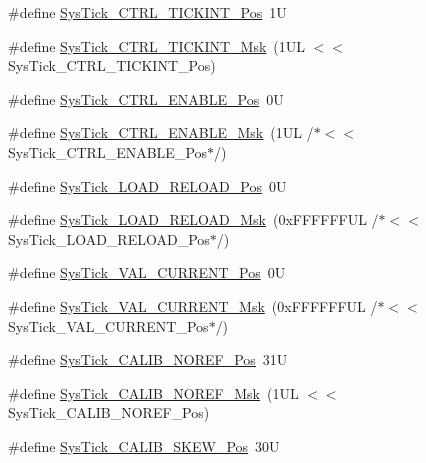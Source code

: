 \begin{DoxyCompactItemize}
\item 
\#define \hyperlink{group___c_m_s_i_s___sys_tick_ga88f45bbb89ce8df3cd2b2613c7b48214}{Sys\-Tick\-\_\-\-C\-T\-R\-L\-\_\-\-T\-I\-C\-K\-I\-N\-T\-\_\-\-Pos}~1\-U
\item 
\#define \hyperlink{group___c_m_s_i_s___sys_tick_ga95bb984266ca764024836a870238a027}{Sys\-Tick\-\_\-\-C\-T\-R\-L\-\_\-\-T\-I\-C\-K\-I\-N\-T\-\_\-\-Msk}~(1\-U\-L $<$$<$ Sys\-Tick\-\_\-\-C\-T\-R\-L\-\_\-\-T\-I\-C\-K\-I\-N\-T\-\_\-\-Pos)
\item 
\#define \hyperlink{group___c_m_s_i_s___sys_tick_ga0b48cc1e36d92a92e4bf632890314810}{Sys\-Tick\-\_\-\-C\-T\-R\-L\-\_\-\-E\-N\-A\-B\-L\-E\-\_\-\-Pos}~0\-U
\item 
\#define \hyperlink{group___c_m_s_i_s___sys_tick_ga16c9fee0ed0235524bdeb38af328fd1f}{Sys\-Tick\-\_\-\-C\-T\-R\-L\-\_\-\-E\-N\-A\-B\-L\-E\-\_\-\-Msk}~(1\-U\-L /$\ast$$<$$<$ Sys\-Tick\-\_\-\-C\-T\-R\-L\-\_\-\-E\-N\-A\-B\-L\-E\-\_\-\-Pos$\ast$/)
\item 
\#define \hyperlink{group___c_m_s_i_s___sys_tick_gaf44d10df359dc5bf5752b0894ae3bad2}{Sys\-Tick\-\_\-\-L\-O\-A\-D\-\_\-\-R\-E\-L\-O\-A\-D\-\_\-\-Pos}~0\-U
\item 
\#define \hyperlink{group___c_m_s_i_s___sys_tick_ga265912a7962f0e1abd170336e579b1b1}{Sys\-Tick\-\_\-\-L\-O\-A\-D\-\_\-\-R\-E\-L\-O\-A\-D\-\_\-\-Msk}~(0x\-F\-F\-F\-F\-F\-F\-U\-L /$\ast$$<$$<$ Sys\-Tick\-\_\-\-L\-O\-A\-D\-\_\-\-R\-E\-L\-O\-A\-D\-\_\-\-Pos$\ast$/)
\item 
\#define \hyperlink{group___c_m_s_i_s___sys_tick_ga3208104c3b019b5de35ae8c21d5c34dd}{Sys\-Tick\-\_\-\-V\-A\-L\-\_\-\-C\-U\-R\-R\-E\-N\-T\-\_\-\-Pos}~0\-U
\item 
\#define \hyperlink{group___c_m_s_i_s___sys_tick_gafc77b56d568930b49a2474debc75ab45}{Sys\-Tick\-\_\-\-V\-A\-L\-\_\-\-C\-U\-R\-R\-E\-N\-T\-\_\-\-Msk}~(0x\-F\-F\-F\-F\-F\-F\-U\-L /$\ast$$<$$<$ Sys\-Tick\-\_\-\-V\-A\-L\-\_\-\-C\-U\-R\-R\-E\-N\-T\-\_\-\-Pos$\ast$/)
\item 
\#define \hyperlink{group___c_m_s_i_s___sys_tick_ga534dbe414e7a46a6ce4c1eca1fbff409}{Sys\-Tick\-\_\-\-C\-A\-L\-I\-B\-\_\-\-N\-O\-R\-E\-F\-\_\-\-Pos}~31\-U
\item 
\#define \hyperlink{group___c_m_s_i_s___sys_tick_ga3af0d891fdd99bcc8d8912d37830edb6}{Sys\-Tick\-\_\-\-C\-A\-L\-I\-B\-\_\-\-N\-O\-R\-E\-F\-\_\-\-Msk}~(1\-U\-L $<$$<$ Sys\-Tick\-\_\-\-C\-A\-L\-I\-B\-\_\-\-N\-O\-R\-E\-F\-\_\-\-Pos)
\item 
\#define \hyperlink{group___c_m_s_i_s___sys_tick_gadd0c9cd6641b9f6a0c618e7982954860}{Sys\-Tick\-\_\-\-C\-A\-L\-I\-B\-\_\-\-S\-K\-E\-W\-\_\-\-Pos}~30\-U

\end{DoxyCompactItemize}
